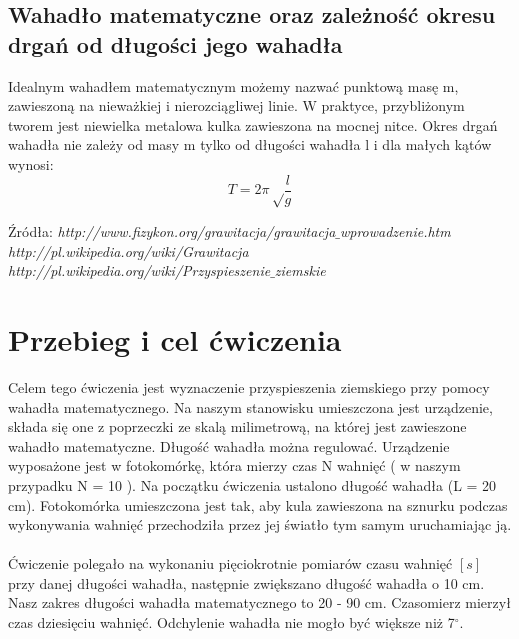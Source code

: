 \documentclass{article}
\begin{document}
\subsection{Wahadło matematyczne oraz zależność okresu drgań od długości jego wahadła}
Idealnym wahadłem matematycznym możemy nazwać punktową masę m, zawieszoną na nieważkiej i nierozciągliwej linie. W praktyce, przybliżonym tworem jest niewielka metalowa kulka zawieszona na mocnej nitce. Okres drgań wahadła nie zależy od masy m tylko od długości wahadła l i dla małych kątów wynosi:
$$T = 2\pi \sqrt\frac{l}{g}$$
\begin{flushright}
\begin{scriptsize}
Źródła: \textit{http://www.fizykon.org/grawitacja/grawitacja$\_$wprowadzenie.htm} \\
\textit{http://pl.wikipedia.org/wiki/Grawitacja}\\
\textit{http://pl.wikipedia.org/wiki/Przyspieszenie$\_$ziemskie}\\
\end{scriptsize}
\end{flushright}
\section{Przebieg i cel ćwiczenia}
Celem tego ćwiczenia jest wyznaczenie przyspieszenia ziemskiego przy pomocy wahadła matematycznego. Na naszym stanowisku umieszczona jest urządzenie, składa się one z poprzeczki ze skalą milimetrową, na której jest zawieszone wahadło matematyczne. Długość wahadła można regulować. Urządzenie wyposażone jest w fotokomórkę, która mierzy czas N wahnięć ( w naszym przypadku N = 10 ). Na początku ćwiczenia ustalono długość wahadła (L = 20 cm). Fotokomórka umieszczona jest tak, aby kula zawieszona na sznurku podczas wykonywania wahnięć przechodziła przez jej światło tym samym uruchamiając ją.
\\\\
Ćwiczenie polegało na wykonaniu pięciokrotnie pomiarów czasu wahnięć $[s]$ przy danej długości wahadła, następnie zwiększano długość wahadła o 10 cm. Nasz zakres długości wahadła matematycznego to 20 - 90 cm. Czasomierz mierzył czas dziesięciu wahnięć. Odchylenie wahadła nie mogło być większe niż 7$^{\circ}$.
\end{document}
